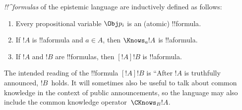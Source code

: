 \documentclass[../../../include/open-logic-section]{subfiles}
\begin{document}
\begin{defn}
\emph{!!^{formula}s} of the epistemic language are inductively
  defined as follows:
\begin{enumerate}


\item Every propositional variable $\Obj p_i$ is an (atomic) !!{formula}.






\item If $!A$ is !!a{formula} and $a \in A$, then $\Knows_a !A$ is
  !!a{formula}.
  
\item If $!A$ and $!B$ are !!{formula}s, then $[!A] !B$ is !!a{formula}.

\end{enumerate}
\end{defn}

The intended reading of the !!{formula} $[!A] !B$ is ``After $!A$ is
truthfully announced, $!B$~holds. It will sometimes also be useful to
talk about common knowledge in the context of public announcements, so
the language may also include the common knowledge operator~$\CKnows_B
!A$.
\end{document}
